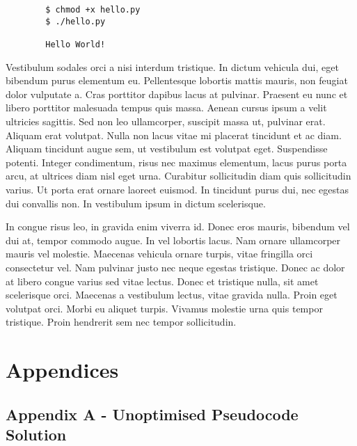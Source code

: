 \documentclass{article}
\begin{document}
\begin{commandline}
	\begin{verbatim}
		$ chmod +x hello.py
		$ ./hello.py

		Hello World!
	\end{verbatim}
\end{commandline}

Vestibulum sodales orci a nisi interdum tristique. In dictum vehicula dui, eget bibendum purus elementum eu. Pellentesque lobortis mattis mauris, non feugiat dolor vulputate a. Cras porttitor dapibus lacus at pulvinar. Praesent eu nunc et libero porttitor malesuada tempus quis massa. Aenean cursus ipsum a velit ultricies sagittis. Sed non leo ullamcorper, suscipit massa ut, pulvinar erat. Aliquam erat volutpat. Nulla non lacus vitae mi placerat tincidunt et ac diam. Aliquam tincidunt augue sem, ut vestibulum est volutpat eget. Suspendisse potenti. Integer condimentum, risus nec maximus elementum, lacus purus porta arcu, at ultrices diam nisl eget urna. Curabitur sollicitudin diam quis sollicitudin varius. Ut porta erat ornare laoreet euismod. In tincidunt purus dui, nec egestas dui convallis non. In vestibulum ipsum in dictum scelerisque.

\begin{warn}[Notice:]
  In congue risus leo, in gravida enim viverra id. Donec eros mauris, bibendum vel dui at, tempor commodo augue. In vel lobortis lacus. Nam ornare ullamcorper mauris vel molestie. Maecenas vehicula ornare turpis, vitae fringilla orci consectetur vel. Nam pulvinar justo nec neque egestas tristique. Donec ac dolor at libero congue varius sed vitae lectus. Donec et tristique nulla, sit amet scelerisque orci. Maecenas a vestibulum lectus, vitae gravida nulla. Proin eget volutpat orci. Morbi eu aliquet turpis. Vivamus molestie urna quis tempor tristique. Proin hendrerit sem nec tempor sollicitudin.
\end{warn}


\printbibliography


\section*{Appendices}
\subsection*{Appendix A - Unoptimised Pseudocode Solution}
\end{document}
